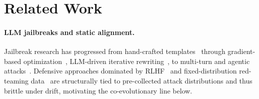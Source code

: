 \section{Related Work}
\label{sec:related}

\paragraph{LLM jailbreaks and static alignment.} Jailbreak research has progressed from hand-crafted templates~\citep{shen2023doanythingnow} through gradient-based optimization~\citep{zou2023universal}, LLM-driven iterative rewriting~\citep{chao2023pair,mehrotra2024tap,liu2023autodan,liu2024autodan}, to multi-turn and agentic attacks~\citep{rahman2025xteaming,qi2025majic,samvelyan2024rainbow,liu2024flipattack}. Defensive approaches dominated by RLHF~\citep{ouyang2022training,bai2022constitutional,dai2023safe} and fixed-distribution red-teaming data~\citep{jiang2024wildteaming,mazeika2024harmbench,xie2024sorry} are structurally tied to pre-collected attack distributions and thus brittle under drift, motivating the co-evolutionary line below.

